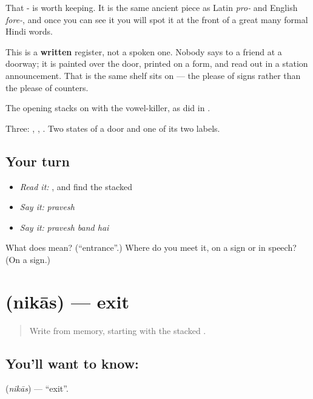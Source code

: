 That - is worth keeping. It is the same ancient piece as Latin \emph{pro-} and English \emph{fore-}, and once you can see it you will spot it at the front of a great many formal Hindi words.

This is a \textbf{written} register, not a spoken one. Nobody says  to a friend at a doorway; it is painted over the door, printed on a form, and read out in a station announcement. That is the same shelf \textbf{} sits on — the please of signs rather than the please of counters.

The opening  stacks  on  with the vowel-killer, as  did in .

\begin{grammarlens}[title={What you've built}]
Three: , , . Two states of a door and one of its two labels.
\end{grammarlens}

\subsection*{Your turn}
\begin{itemize}
\raggedright
  \item \emph{Read it:} , and find the stacked 
  \item \emph{Say it:} \emph{pravesh}
  \item \emph{Say it:} \emph{pravesh band hai}
\end{itemize}

\begin{tcolorbox}[breakable,colback=teal!4,colframe=teal!35!black,title={Before you move on}]
What does  mean? (\textquotedblleft{}entrance\textquotedblright{}.) Where do you meet it, on a sign or in speech? (On a sign.)
\end{tcolorbox}
\section[nikās]{ (nikās) — exit}

\label{lesson:HI-C74-exit}



\begin{quote}
Write \textbf{} from memory, starting with the stacked .
\end{quote}

\subsection*{You'll want to know: }
\textbf{} (\emph{nikās}) — \textquotedblleft{}exit\textquotedblright{}.


